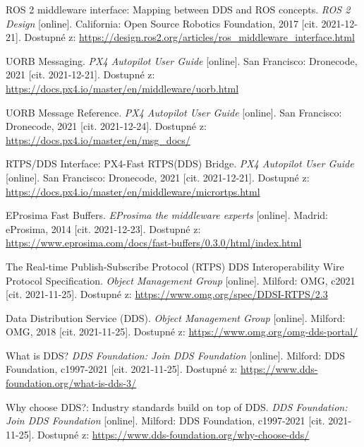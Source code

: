 \begin{thebibliography}{99}
ROS 2 middleware interface: Mapping between DDS and ROS concepts. \textit{ROS 2 Design} [online]. California: Open Source Robotics Foundation, 2017 [cit. 2021-12-21]. Dostupné z: \href{https://design.ros2.org/articles/ros\_middleware\_interface.html}{https://design.ros2.org/articles/ros\_middleware\_interface.html}

UORB Messaging. \textit{PX4 Autopilot User Guide} [online]. San Francisco: Dronecode, 2021 [cit. 2021-12-21]. Dostupné z: \href{https://docs.px4.io/master/en/middleware/uorb.html}{https://docs.px4.io/master/en/middleware/uorb.html}

UORB Message Reference. \textit{PX4 Autopilot User Guide} [online]. San Francisco: Dronecode, 2021 [cit. 2021-12-24]. Dostupné z: \href{https://docs.px4.io/master/en/msg\_docs/}{https://docs.px4.io/master/en/msg\_docs/}

RTPS/DDS Interface: PX4-Fast RTPS(DDS) Bridge. \textit{PX4 Autopilot User Guide} [online]. San Francisco: Dronecode, 2021 [cit. 2021-12-21]. Dostupné z: \href{https://docs.px4.io/master/en/middleware/micrortps.html}{https://docs.px4.io/master/en/middleware/micrortps.html}

EProsima Fast Buffers. \textit{EProsima the middleware experts} [online]. Madrid: eProsima, 2014 [cit. 2021-12-23]. Dostupné z: \href{https://www.eprosima.com/docs/fast-buffers/0.3.0/html/index.html}{https://www.eprosima.com/docs/fast-buffers/0.3.0/html/index.html}

The Real-time Publish-Subscribe Protocol (RTPS) DDS Interoperability Wire Protocol Specification. \textit{Object Management Group} [online]. Milford: OMG, c2021 [cit. 2021-11-25]. Dostupné z: \href{https://www.omg.org/spec/DDSI-RTPS/2.3}{https://www.omg.org/spec/DDSI-RTPS/2.3}
	
Data Distribution Service (DDS). \textit{Object Management Group} [online]. Milford: OMG, 2018 [cit. 2021-11-25]. Dostupné z: \href{https://www.omg.org/omg-dds-portal/}{https://www.omg.org/omg-dds-portal/}

What is DDS? \textit{DDS Foundation: Join DDS Foundation} [online]. Milford: DDS Foundation, c1997-2021 [cit. 2021-11-25]. Dostupné z: \href{https://www.dds-foundation.org/what-is-dds-3/}{https://www.dds-foundation.org/what-is-dds-3/}

Why choose DDS?: Industry standards build on top of DDS. \textit{DDS Foundation: Join DDS Foundation} [online]. Milford: DDS Foundation, c1997-2021 [cit. 2021-11-25]. Dostupné z: \href{https://www.dds-foundation.org/why-choose-dds/}{https://www.dds-foundation.org/why-choose-dds/}


\end{thebibliography}
